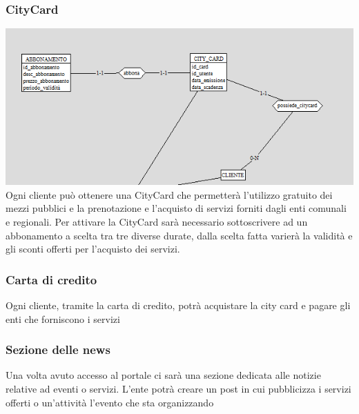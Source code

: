 \subsubsection{CityCard}
\includegraphics[width=0.95\columnwidth]{images/CityCard.png} \\
Ogni cliente può ottenere una CityCard che  permetterà l'utilizzo gratuito dei mezzi pubblici e la prenotazione e l'acquisto di servizi forniti dagli enti comunali e regionali. Per attivare la CityCard sarà necessario sottoscrivere ad un abbonamento a scelta tra tre diverse durate, dalla scelta fatta varierà la validità e gli sconti offerti  per l'acquisto dei servizi.
\subsubsection{Carta di credito} 
Ogni cliente, tramite la carta di credito, potrà acquistare la city card e pagare gli enti che forniscono i servizi
\subsubsection{Sezione delle news}
Una volta avuto accesso al portale ci sarà una sezione dedicata alle notizie relative ad eventi o servizi.
L'ente potrà creare un post in cui pubblicizza i servizi offerti o un'attività l'evento che sta organizzando

